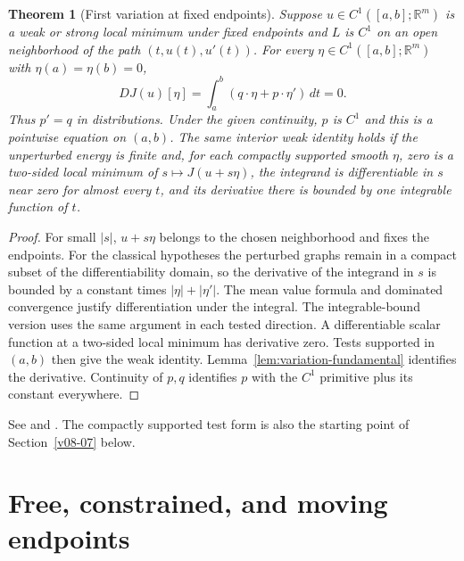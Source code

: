 \documentclass[11pt,oneside,openany]{book}
\theoremstyle{plain}
\newtheorem{theorem}{Theorem}[chapter]
\theoremstyle{definition}
\theoremstyle{remark}
\begin{document}
\begin{theorem}[First variation at fixed endpoints]
\label{thm:first-variation}
Suppose \(u\in C^1([a,b];\mathbb R^m)\) is a weak or strong local
minimum under fixed endpoints and \(L\) is \(C^1\) on an open
neighborhood of the path \((t,u(t),u'(t))\). For every
\(\eta\in C^1([a,b];\mathbb R^m)\) with \(\eta(a)=\eta(b)=0\),
\[
 DJ(u)[\eta]=\int_a^b (q\cdot\eta+p\cdot\eta')\,dt=0.
\]
Thus \(p'=q\) in distributions. Under the given continuity,
\(p\) is \(C^1\) and this is a pointwise equation on \((a,b)\).
The same interior weak identity holds if the unperturbed energy is finite
and, for each compactly supported smooth \(\eta\), zero is a two-sided
local minimum of \(s\mapsto J(u+s\eta)\), the integrand is differentiable
in \(s\) near zero for almost every \(t\), and its derivative there is
bounded by one integrable function of \(t\).
\end{theorem}
\begin{proof}
For small \(|s|\), \(u+s\eta\) belongs to the chosen neighborhood
and fixes the endpoints. For the classical hypotheses the
perturbed graphs remain in a compact subset of the differentiability
domain, so the derivative of the integrand in \(s\) is bounded
by a constant times \(|\eta|+|\eta'|\).
The mean value formula and dominated convergence justify
differentiation under the integral. The integrable-bound version
uses the same argument in each tested direction. A differentiable
scalar function at a two-sided local minimum has derivative zero.
Tests supported in \((a,b)\) then give the weak identity.
Lemma~\ref{lem:variation-fundamental} identifies the derivative.
Continuity of \(p,q\) identifies \(p\) with the \(C^1\)
primitive plus its constant everywhere.
\end{proof}

See \cite[Section 1.3.3 and Theorem 2.1]{Dacorogna} and
\cite[Sections 2.2--2.3]{Liberzon}. The compactly supported test
form is also the starting point of Section~\ref{v08-07} below.

\section{Free, constrained, and moving endpoints}
\label{v07-02}
\end{document}
